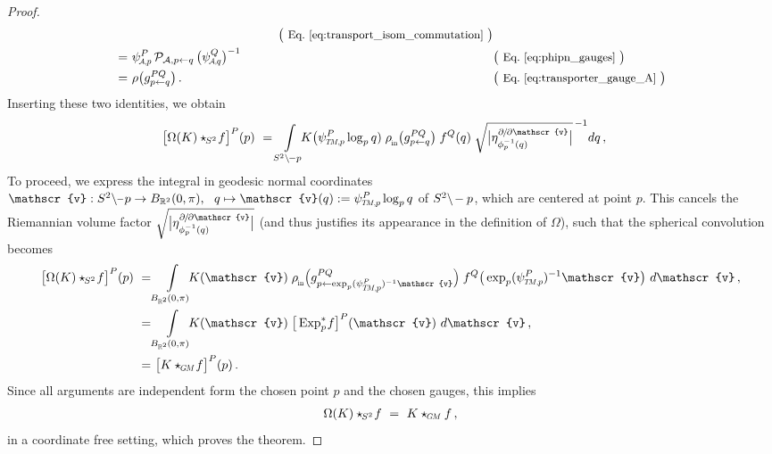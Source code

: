 \begin{proof}
\begin{alignat}{3}
            \qquad && \big( \text{\small Eq.~\eqref{eq:transport_isom_commutation} } \big) \notag\\
        \ =&\ \psiAp^P\, \mathcal{P}_{\A, p\leftarrow q}\, \big(\psiAq^Q\big)^{-1}
            \qquad && \big( \text{\small Eq.~\eqref{eq:phipn_gauges} } \big) \notag\\
        \ =&\ \rho\big( g_{p\leftarrow q}^{PQ} \big) \,.
            \qquad && \big( \text{\small Eq.~\eqref{eq:transporter_gauge_A} } \big) \notag
    \end{alignat}
    Inserting these two identities, we obtain
    \begin{align}
        \big[\Omega(K) \star_{\mkern-2mu S^2}\! f\big]^P(p)
        \ &= \int\limits_{S^2 \backslash \mkern-2mu -p} \mkern-8mu K\big( \psiTMp^P \log_p q)\; \rhoin\big( g_{p\leftarrow q}^{PQ} \big)\; f^Q(q)\; \sqrt{\big|\eta_{\phi_p^{-1}(q)}^{\partial\mkern-2mu/\mkern-2mu\partial\mathscr{v}}\big|}^{\,-1} dq \,, \notag
    \end{align}
    To proceed, we express the integral in geodesic normal coordinates 
    $\mathscr{v}: S^2\backslash \mkern-1mu\minus\mkern1mu p \to B_{\R^2}(0,\pi),\ \ q \mapsto \mathscr{v}(q) := \psiTMp^P \log_p q$
    of $S^2 \backslash \mkern-2mu -p$, which are centered at point $p$.
    This cancels the Riemannian volume factor
    $\sqrt{\big|\eta_{\phi_p^{-1}(q)}^{\partial\mkern-2mu/\mkern-2mu\partial\mathscr{v}}\big|}$
    (and thus justifies its appearance in the definition of $\Omega$),
    such that the spherical convolution becomes
    \begin{align}
        \big[\Omega(K) \star_{\mkern-2mu S^2}\! f\big]^P(p)
        \ =& \int\limits_{B_{\R^2}\mkern-1mu(0,\pi)} \mkern-8mu K(\mathscr{v})\; \rhoin\pig( g_{p\leftarrow \exp_p (\psiTMp^P)^{-1} \mathscr{v}}^{PQ} \pig)\; f^Q\big( \exp_p (\psiTMp^P)^{-1} \mathscr{v} \big)\ d\mathscr{v} \,, \notag \\
        \ =& \int\limits_{B_{\R^2}\mkern-1mu(0,\pi)} \mkern-8mu K(\mathscr{v})\; \big[\Expspf\big]^P(\mathscr{v})\ d\mathscr{v} \,, \notag \\
       =&\ \big[K \star_{\mkern-1mu\scalebox{.64}{$\GM$}}\! f\big]^P(p) \,.
    \end{align}
    Since all arguments are independent form the chosen point $p$ and the chosen gauges, this implies
    \begin{align}
        \Omega(K) \star_{\mkern-2mu S^2}\! f\ =\ K \star_{\mkern-1mu\scalebox{.64}{$\GM$}} f \,,
    \end{align}
    in a coordinate free setting, which proves the theorem.
\end{proof}



